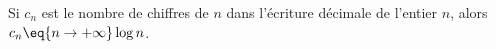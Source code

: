 Si $c_n$ est le nombre de chiffres de $n$ dans l'écriture décimale de l'entier $n$, alors $c_n \eq{n\to+\infty}  \log n$. 

\begin{reponses}
\end{reponses}

